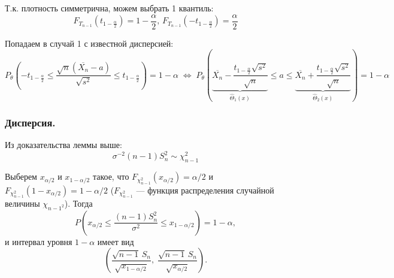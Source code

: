 \begin{enumerate}
	Т.к. плотность симметрична, можем выбрать 1 квантиль:
	\[ F_{T_{n-1}}(t_{1 - \frac{\alpha}2}) = 1 - \frac{\alpha}2, \, F_{T_{n-1}}(-t_{1 - \frac{\alpha}2}) = \frac{\alpha}2 \]
	
	Попадаем в случай 1 с известной дисперсией:
	\[ P_{\theta} \left( -t_{1 - \frac{\alpha}2} \le \frac{\sqrt{n}(\overline{X_n} - a)}{\sqrt{s^2}} \le t_{1 - \frac{\alpha}2} \right) = 
	1 - \alpha \;\Leftrightarrow\; 
	P_{\theta} \left( \underset{\hat\Theta_1(x)}{\underbrace{\overline{X_n} - \frac{t_{1 - \frac{\alpha}2} \sqrt{s^2}}{\sqrt{n}}}} \le a \le 
	\underset{\hat\Theta_2(x)}{\underbrace{\overline{X_n} + \frac{t_{1 - \frac{\alpha}2} \sqrt{s^2}}{\sqrt{n}}}} \right) = 1 - \alpha \]
\end{enumerate}

\subsubsection{Дисперсия.}

Из доказательства леммы выше:
\[ \sigma^{-2}(n - 1) S_n^2 \sim \chi_{n-1}^2 \]

Выберем $x_{\alpha/2}$ и $x_{1-\alpha/2}$ такое, что $F_{\chi_{n-1}^2}(x_{\alpha/2}) = \alpha/2$ и $F_{\chi_{n-1}^2}(1-x_{\alpha/2}) = 1-\alpha/2$ ($F_{\chi_{n-1}^2}$ --- функция распределения случайной величины $\chi_{n-1^2}$). Тогда
\[ P \left( x_{\alpha/2} \le \frac{(n-1) S_n^2}{\sigma^2} \le x_{1-\alpha/2} \right) = 1 - \alpha, \]
и интервал уровня $1 - \alpha$ имеет вид 
\[ \left( \frac{\sqrt{n-1}\,S_n}{\sqrt{x_{1-\alpha/2}}}, \; \frac{\sqrt{n-1}\,S_n}{\sqrt{x_{\alpha/2}}} \right). \] 
